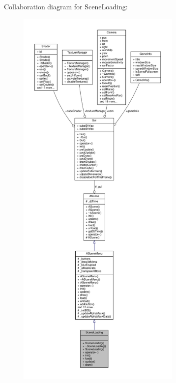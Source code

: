 Collaboration diagram for Scene\+Loading\+:
\nopagebreak
\begin{figure}[H]
\begin{center}
\leavevmode
\includegraphics[height=550pt]{class_scene_loading__coll__graph}
\end{center}
\end{figure}
